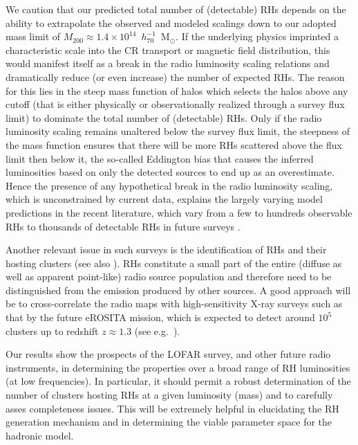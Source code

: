 \documentclass[traditabstract]{aa}
\begin{document}
We caution that our predicted total number of (detectable) RHs depends on the
ability to extrapolate the observed and modeled scalings down to our adopted
mass limit of $M_{200}\approx1.4\times10^{14}$~$h_{70}^{-1}$~M$_{\odot}$. If the
underlying physics imprinted a characteristic scale into the CR transport or
magnetic field distribution, this would manifest itself as a break in the radio
luminosity scaling relations and dramatically reduce (or even increase) the
number of expected RHs. The reason for this lies in the steep mass function of
halos which selects the halos above any cutoff (that is either physically or
observationally realized through a survey flux limit) to dominate the total
number of (detectable) RHs. Only if the radio luminosity scaling remains
unaltered below the survey flux limit, the steepness of the mass function
ensures that there will be more RHs scattered above the flux limit then below
it, the so-called Eddington bias that causes the inferred luminosities based on
only the detected sources to end up as an overestimate. Hence the presence of
any hypothetical break in the radio luminosity scaling, which is unconstrained
by current data, explains the largely varying model predictions in the recent
literature, which vary from a few to hundreds observable RHs
\citep{2010A&A...509A..68C,2011arXiv1110.2786S} to thousands of detectable RHs
in future surveys \citep{2002A&A...396...83E}.

Another relevant issue in such surveys is the identification of RHs and their
hosting clusters (see also \citealp{2010A&A...509A..68C}). RHs constitute a
small part of the entire (diffuse as well as apparent point-like) radio source
population and therefore need to be distinguished from the emission produced by
other sources. A good approach will be to cross-correlate the radio maps with
high-sensitivity X-ray surveys such as that by the future eROSITA mission, which
is expected to detect around $10^{5}$ clusters up to redshift $z \approx 1.3$
(see e.g.~\citealp{2011MSAIS..17..159C}).

Our results show the prospects of the LOFAR survey, and other future radio
instruments, in determining the properties over a broad range of RH luminosities
(at low frequencies). In particular, it should permit a robust determination of
the number of clusters hosting RHs at a given luminosity (mass) and to carefully
asses completeness issues. This will be extremely helpful in elucidating the RH
generation mechanism and in determining the viable parameter space for the
hadronic model.
\end{document}

